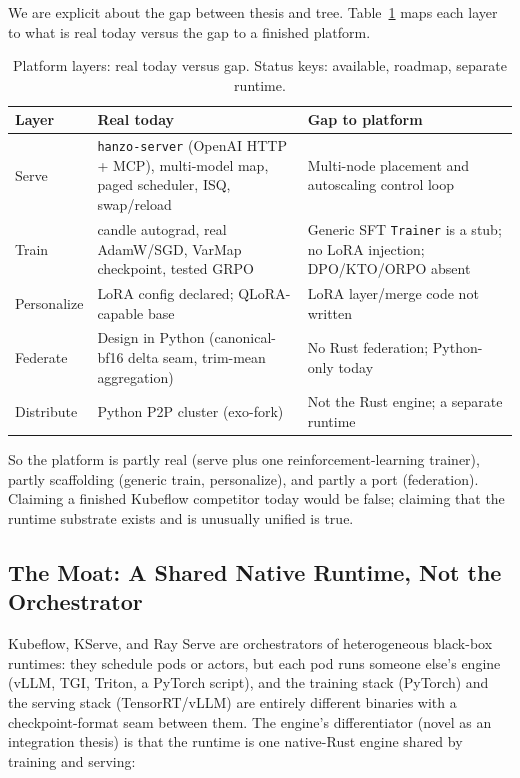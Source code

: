 \documentclass[11pt]{article}
\begin{document}
We are explicit about the gap between thesis and tree. Table~\ref{tab:platform} maps each layer to what is real today versus the gap to a finished platform.

\begin{table}[h]
\centering
\caption{Platform layers: real today versus gap. Status keys: available, roadmap, separate runtime.}
\label{tab:platform}
\begin{tabular}{@{}p{1.7cm}p{2.6cm}p{2.6cm}@{}}
\toprule
\textbf{Layer} & \textbf{Real today} & \textbf{Gap to platform} \\
\midrule
Serve & \texttt{hanzo-server} (OpenAI HTTP + MCP), multi-model map, paged scheduler, ISQ, swap/reload & Multi-node placement and autoscaling control loop \\
Train & candle autograd, real AdamW/SGD, VarMap checkpoint, tested GRPO & Generic SFT \texttt{Trainer} is a stub; no LoRA injection; DPO/KTO/ORPO absent \\
Personalize & LoRA config declared; QLoRA-capable base & LoRA layer/merge code not written \\
Federate & Design in Python (canonical-bf16 delta seam, trim-mean aggregation) & No Rust federation; Python-only today \\
Distribute & Python P2P cluster (exo-fork) & Not the Rust engine; a separate runtime \\
\bottomrule
\end{tabular}
\end{table}

So the platform is partly real (serve plus one reinforcement-learning trainer), partly scaffolding (generic train, personalize), and partly a port (federation). Claiming a finished Kubeflow competitor today would be false; claiming that the runtime substrate exists and is unusually unified is true.

\subsection{The Moat: A Shared Native Runtime, Not the Orchestrator}

Kubeflow, KServe, and Ray Serve are orchestrators of heterogeneous black-box runtimes: they schedule pods or actors, but each pod runs someone else's engine (vLLM, TGI, Triton, a PyTorch script), and the training stack (PyTorch) and the serving stack (TensorRT/vLLM) are entirely different binaries with a checkpoint-format seam between them. The engine's differentiator (novel as an integration thesis) is that the runtime is one native-Rust engine shared by training and serving:
\end{document}

